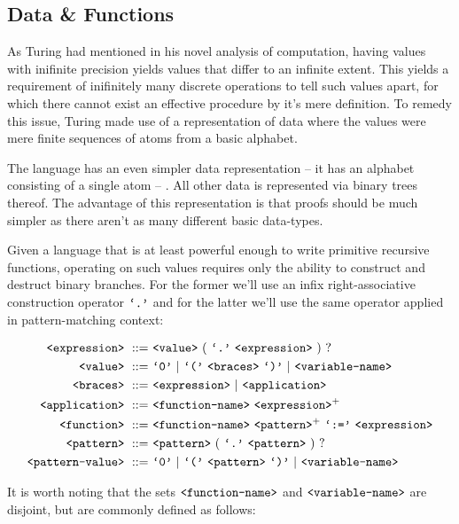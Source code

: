 \subsection{Data \& Functions}

As Turing had mentioned in his novel analysis of
computation\cite{turing-machine}, having values with inifinite precision yields
values that differ to an infinite extent. This yields a requirement of
inifinitely many discrete operations to tell such values apart, for which there
cannot exist an effective procedure by it's mere definition. To remedy this
issue, Turing made use of a representation of data where the values were mere
finite sequences of atoms from a basic alphabet.

The language  has an even simpler data representation -- it has an
alphabet consisting of a single atom -- . All other data is
represented via binary trees thereof. The advantage of this representation is
that proofs should be much simpler as there aren't as many different basic
data-types.

Given a language that is at least powerful enough to write primitive recursive
functions, operating on such values requires only the ability to construct and
destruct binary branches. For the former we'll use an infix right-associative
construction operator $\text{{\ttfamily`.'}}$ and for the latter we'll use the same operator
applied in pattern-matching context:

\begin{align}
\nonterm{expression}\ ::=&\ \nonterm{value}\ (\ \term{.}\ \nonterm{expression}
\ )\ ?\\
\nonterm{value}\ ::=&\ \term{0}\ |\ \term{(}\ \nonterm{braces}\ \term{)}\ |
\ \nonterm{variable-name}\\
\nonterm{braces}\ ::=&\ \nonterm{expression}\ |
\ \nonterm{application}\\
\nonterm{application}\ ::=&\ \nonterm{function-name}
\ \nonterm{expression}^+\\
\nonterm{function}\ ::=&\ \nonterm{function-name}\ \nonterm{pattern}^+
\ \term{:=}\ \nonterm{expression}\\
\nonterm{pattern}\ ::=&\ \nonterm{pattern}\ (\ \term{.}
\ \nonterm{pattern}\ )\ ?\\
\nonterm{pattern-value}\ ::=&\ \term{0}\ |\ \term{(}
\ \nonterm{pattern}\ \term{)}\ |\ \nonterm{variable-name}
\end{align}

It is worth noting that the sets $\text{{\ttfamily<function-name>}}$ and
$\text{{\ttfamily<variable-name>}}$ are disjoint, but are commonly defined as follows:

